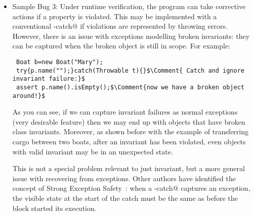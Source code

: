 \begin{itemize}
\item Sample Bug 3:
Under runtime verification, the program can take corrective actions if a property is violated.
This may be implemented with a conventional \Q@try-catch@ if violations are represented by throwing errors.
However, there is an issue with exceptions modelling broken invariants: they can be captured when the broken object is still in scope. For example:

\begin{lstlisting}
 Boat b=new Boat("Mary");
 try{p.name("");}catch(Throwable t){}$\Comment{ Catch and ignore invariant failure:}$
 assert p.name().isEmpty();$\Comment{now we have a broken object around!}$
\end{lstlisting}

As you can see, if we can capture invariant failures as normal exceptions (very desirable feature) then we may end up with objects that have broken class invariants.
Moreover,
 as shown before with the example of transferring cargo between two boats,
after an invariant has been violated, even objects with valid invariant may be in an unexpected state.

This is not a special problem relevant to just invariant, but a more general issue with
recovering from exceptions.
Other authors have identified the concept of Strong Exception Safety~\cite{Abrahams2000}:
when a \Q@try-catch@ captures an exception, the visible state at the start of the catch must be the same as before the \Q@try@ block started its execution.
\end{itemize}


